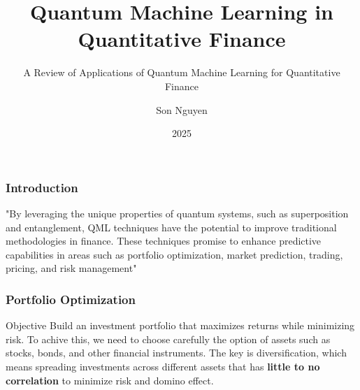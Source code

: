 \documentclass{beamer}
\title{Quantum Machine Learning in Quantitative Finance}
\subtitle{A Review of Applications of Quantum Machine Learning for Quantitative
Finance}
\author{Son Nguyen}
\institute{Stevens Institute of Technology}
\date{2025}
\begin{document}
\frame{\titlepage}
\begin{frame}
    \frametitle{Introduction}
    "By leveraging the unique properties of quantum systems,
    such as superposition and entanglement, QML techniques have the potential to improve traditional
    methodologies in finance. These techniques promise to enhance predictive capabilities in areas such
    as portfolio optimization, market prediction, trading, pricing, and risk management"
\end{frame}
\begin{frame}
    \frametitle{Portfolio Optimization}
    \begin{block}{Objective}
        Build an investment portfolio that maximizes returns while minimizing risk. To achive this, we need to choose carefully the option of assets such as
        stocks, bonds, and other financial instruments. The key is diversification, which means spreading investments across different assets that has \textbf{little to no correlation} to minimize risk and domino effect.
    \end{block}
    

\end{frame}
\end{document}
